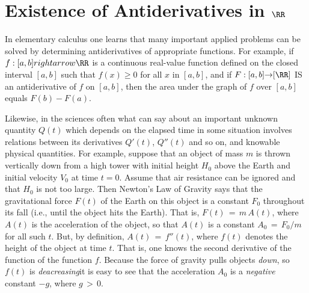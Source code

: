 %
%


                  \chapter{Existence of Antiderivatives in ${\RR}$}
                  \label{ChaptEE}
     
     \label{SectEE20}
     
     In elementary calculus one learns that many important applied problems can be solved by determining antiderivatives of appropriate functions.
     For example, if $f:[a,b]{rightarrow}{\RR}$ is a continuous real-value function defined on the closed interval $[a,b]$ such that $f(x){\geq}0$ for all $x$ in $[a,b]$,
     and if $F:[a,b]{\rightarrow}[\RR]$ IS an antiderivative of $f$ on $[a,b]$, then the area under the graph of $f$ over $[a,b]$ equals $F(b) - F(a)$.
     
     Likewise, in the sciences often what can say about an important unknown quantity $Q(t)$ which depends on the elapsed time in some situation involves relations between 
     its derivatives $Q'(t)$, $Q''(t)$ and so on, and knowable physical quantities. For example, suppose that an object of mass $m$ is thrown vertically down from a high tower
     with initial height $H_{0}$ above the Earth and initial velocity $V_{0}$ at time $t=0$. Assume that air resistance can be ignored and that $H_{0}$ is not too large.
     Then  Newton's Law of Gravity says that the gravitational force $F(t)$ of the Earth on this object is a constant $F_{0}$ throughout its fall (i.e., until the object hits the Earth).
     That is, $F(t) \,=\,m\, A(t)$, where $A(t)$ is the acceleration of the object, so that $A(t)$ is a constant $A_{0}\,=\,F_{0}/m$ for all such $t$.
     But, by definition, $A(t)\,=\,f''(t)$, where $f(t)$ denotes the height of the object at time $t$. That is, one knows the second derivative of the function of the function $f$.
     Because the force of gravity pulls objects {\it down}, so $f(t)$ is {\it deacreasing}it is easy to see that the acceleration $A_{0}$ is a {\it negative} constant $-g$, where $g{\,>\,} 0$.
     
     
